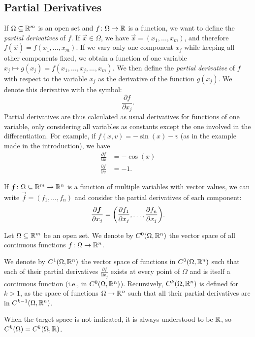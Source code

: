 \subsection{Partial Derivatives}

If $\Omega\subseteq {\mathbb R}^m$ is an open set and $f\colon \Omega \to {\mathbb R}$
is a function, we want to define the \emph{partial derivatives} of $f$.
If $\vec x \in \Omega$, we have $\vec x = (x_1,\dots, x_m)$, and therefore
$f(\vec x) = f(x_1,\dots, x_m)$. If we vary only one component
$x_j$ while keeping all other components fixed, we obtain a function
of one variable $x_j \mapsto g(x_j) = f(x_1,\dots, x_j, \dots, x_m)$.
We then define the \emph{partial derivative}
of $f$ with respect to the variable $x_j$ as the derivative of the function
$g(x_j)$.
We denote this derivative with the symbol:
\[
  \frac{\partial f}{\partial x_j}.
\]
Partial derivatives are thus calculated as usual derivatives for functions of
one variable, only considering all variables as constants except the one
involved in the differentiation.
For example, if $f(x,v) = -\sin(x) - v$
(as in the example made in the introduction), we have
\begin{align*}
  \frac{\partial f}{\partial x} &= -\cos(x)\\
  \frac{\partial f}{\partial v} &= -1.
\end{align*}

If $\boldsymbol f\colon \Omega \subseteq {\mathbb R}^m \to {\mathbb R}^n$ is a function of multiple
variables with vector values, we can write $\vec f = (f_1, \dots, f_n)$
and consider the partial derivatives of each component:
\[
  \frac{\partial \boldsymbol f}{\partial x_j}
    = {\left( \frac{\partial f_1}{\partial x_j}, \dots, \frac{\partial
  f_n}{\partial x_j} \right)}.
\]

\begin{definition}
Let $\Omega\subseteq {\mathbb R}^m$ be an open set. We denote by $C^0(\Omega,{\mathbb R}^n)$
the vector space of all continuous functions
$f\colon \Omega \to {\mathbb R}^n$.

We denote by $C^1(\Omega,{\mathbb R}^n)$ the vector space
of functions in $C^0(\Omega,{\mathbb R}^n)$ such that each of their partial derivatives
$\frac{\partial f}{\partial x_j}$ exists at every point of $\Omega$ and
is itself a continuous function (i.e., in $C^0(\Omega,{\mathbb R}^n)$).
Recursively, $C^k(\Omega,{\mathbb R}^n)$ is defined for $k>1$,
as the space of functions $\Omega\to{\mathbb R}^n$ such that all their partial
derivatives are in $C^{k-1}(\Omega,{\mathbb R}^n)$.

When the target space is not indicated, it is always understood to be ${\mathbb R}$, so
$C^k(\Omega) = C^k(\Omega,{\mathbb R})$.
\end{definition}

